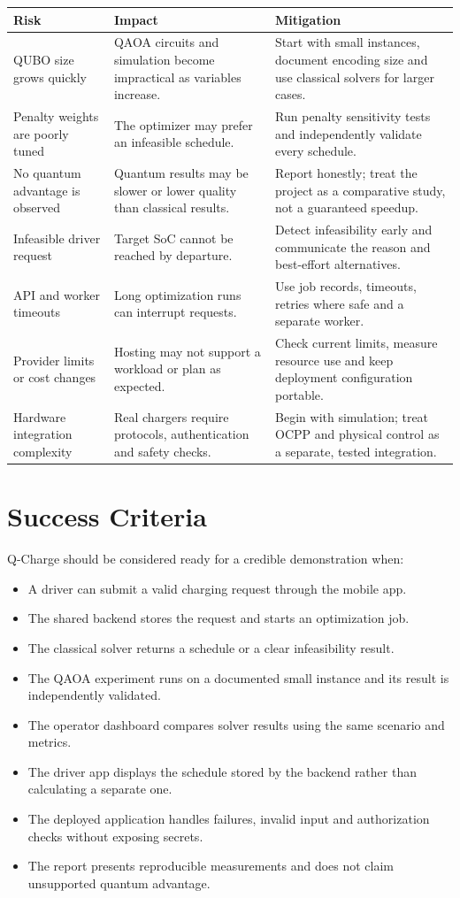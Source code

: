 \documentclass[11pt,a4paper]{article}
\begin{document}
\begin{longtable}{p{3.4cm}p{5.1cm}p{4.4cm}}
\toprule
\textbf{Risk} & \textbf{Impact} & \textbf{Mitigation} \\
\midrule
QUBO size grows quickly & QAOA circuits and simulation become impractical as variables increase. & Start with small instances, document encoding size and use classical solvers for larger cases. \\
Penalty weights are poorly tuned & The optimizer may prefer an infeasible schedule. & Run penalty sensitivity tests and independently validate every schedule. \\
No quantum advantage is observed & Quantum results may be slower or lower quality than classical results. & Report honestly; treat the project as a comparative study, not a guaranteed speedup. \\
Infeasible driver request & Target SoC cannot be reached by departure. & Detect infeasibility early and communicate the reason and best-effort alternatives. \\
API and worker timeouts & Long optimization runs can interrupt requests. & Use job records, timeouts, retries where safe and a separate worker. \\
Provider limits or cost changes & Hosting may not support a workload or plan as expected. & Check current limits, measure resource use and keep deployment configuration portable. \\
Hardware integration complexity & Real chargers require protocols, authentication and safety checks. & Begin with simulation; treat OCPP and physical control as a separate, tested integration. \\
\bottomrule
\end{longtable}

\section{Success Criteria}

Q-Charge should be considered ready for a credible demonstration when:
\begin{itemize}
  \item A driver can submit a valid charging request through the mobile app.
  \item The shared backend stores the request and starts an optimization job.
  \item The classical solver returns a schedule or a clear infeasibility result.
  \item The QAOA experiment runs on a documented small instance and its result is independently validated.
  \item The operator dashboard compares solver results using the same scenario and metrics.
  \item The driver app displays the schedule stored by the backend rather than calculating a separate one.
  \item The deployed application handles failures, invalid input and authorization checks without exposing secrets.
  \item The report presents reproducible measurements and does not claim unsupported quantum advantage.
\end{itemize}
\end{document}
